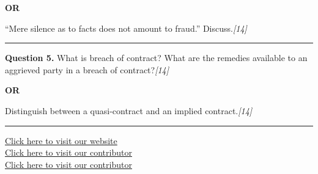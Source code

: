 \documentclass[11pt,a4paper]{article}
\newcommand{\pts}[1]{\hfill   \textit{[#1]}}
\begin{document}
\centerline{   \textbf{OR}}

``Mere silence as to facts does not amount to fraud.'' Discuss.\pts{14}

\medskip\rule{\linewidth}{0.2pt}




\noindent   \textbf{Question 5.}
What is breach of contract? What are the remedies available to an aggrieved party in a breach of contract?\pts{14}

\centerline{   \textbf{OR}}

Distinguish between a quasi-contract and an implied contract.\pts{14}

\vfill
\rule{\linewidth}{0.4pt}

\begin{center}\small
\href{https://bhu-exam.vercel.app/}{Click here to visit our website}\\[4pt]
\href{https://me-aryan.vercel.app/}{Click here to visit our contributor}\\[4pt]
\href{https://quashan-me.vercel.app/}{Click here to visit our contributor}
\end{center}
\end{document}
